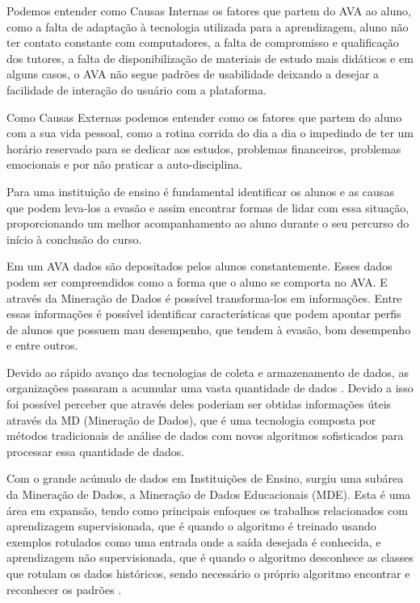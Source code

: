 Podemos entender como Causas Internas os fatores que partem do AVA ao aluno, como a falta de adaptação à tecnologia utilizada para a aprendizagem, aluno não ter contato constante com computadores, a falta de compromisso e qualificação dos tutores, a falta de disponibilização de materiais de estudo mais didáticos e em alguns casos, o AVA não segue padrões de usabilidade deixando a desejar a facilidade de interação do usuário com a plataforma.

Como Causas Externas podemos entender como os fatores que partem do aluno com a sua vida pessoal, como a rotina corrida do dia a dia o impedindo de ter um horário reservado para se dedicar aos estudos, problemas financeiros, problemas emocionais e por não praticar a auto-disciplina.

Para uma instituição de ensino é fundamental identificar os alunos e as causas que podem leva-los a evasão e assim encontrar formas de lidar com essa situação, proporcionando um melhor acompanhamento ao aluno durante o seu percurso do início à conclusão do curso.

Em um AVA dados são depositados pelos alunos constantemente. Esses dados podem ser compreendidos como a forma que o aluno se comporta no AVA. E através da Mineração de Dados é possível transforma-los em informações. Entre essas informações é possível identificar características que podem apontar perfis de alunos que possuem mau desempenho, que tendem à evasão, bom desempenho e entre outros.

\label{sec:mineracao}

Devido ao rápido avanço das tecnologias de coleta e armazenamento de dados, as organizações passaram a acumular uma vasta quantidade de dados \cite{tan2006introduction}. Devido a isso foi possível perceber que através deles poderiam ser obtidas informações úteis através da MD (Mineração de Dados), que é uma tecnologia composta por métodos tradicionais de análise de dados com novos algoritmos sofisticados para processar essa quantidade de dados.

Com o grande acúmulo de dados em Instituições de Ensino, surgiu uma subárea da Mineração de Dados, a Mineração de Dados Educacionais (MDE). Esta é uma área em expansão, tendo como principais enfoques os trabalhos relacionados com aprendizagem supervisionada, que é quando o algoritmo é treinado usando exemplos rotulados como uma entrada onde a saída desejada é conhecida, e aprendizagem não supervisionada, que é quando o algoritmo desconhece as classes que rotulam os dados históricos, sendo necessário o próprio algoritmo encontrar e reconhecer os padrões \cite{cambruzzi2014gvwise}.

